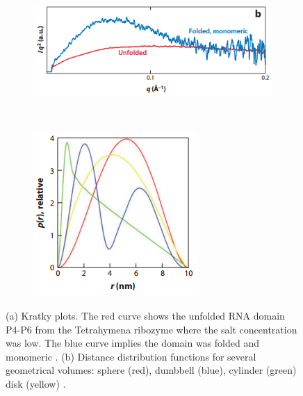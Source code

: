     \begin{figure}
        \centering
        \begin{subfigure}[b]{0.8\textwidth}
                \centering
                \includegraphics[width=\textwidth]{figures/introduction/kratkyplot.png}
                \caption{}
                \label{fig:Kratky plot}
        \end{subfigure}
        \\
        \begin{subfigure}[b]{0.6\textwidth}
                \centering
                \includegraphics[width=\textwidth]{figures/introduction/distancedistribution.png}
                \caption{}
                \label{fig:Distance distribution plot}
        \end{subfigure}
        \caption[Example Kratky curves and distance distribution function]{(a) Kratky plots.
        The red curve shows the unfolded RNA domain P4-P6 from the Tetrahymena ribozyme where the salt concentration was low.
        The blue curve implies the domain was folded and monomeric \cite{pollack2011saxs}.
        (b) Distance distribution functions for several geometrical volumes: sphere (red),  dumbbell (blue), cylinder (green) disk (yellow) \cite{blanchet2013small}.}
        \label{fig:SAXS structural analysis graphs}
    \end{figure}
